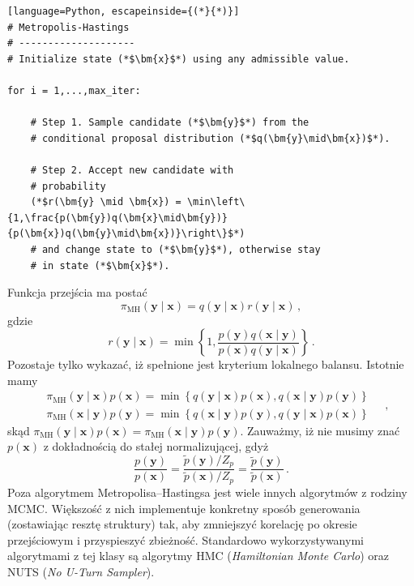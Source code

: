 \documentclass{myclass}
\begin{document}
\begin{lstlisting}[language=Python, escapeinside={(*}{*)}]
# Metropolis-Hastings 
# -------------------- 
# Initialize state (*$\bm{x}$*) using any admissible value. 

for i = 1,...,max_iter: 

    # Step 1. Sample candidate (*$\bm{y}$*) from the 
    # conditional proposal distribution (*$q(\bm{y}\mid\bm{x})$*).
    
    # Step 2. Accept new candidate with 
    # probability 
    (*$r(\bm{y} \mid \bm{x}) = \min\left\{1,\frac{p(\bm{y})q(\bm{x}\mid\bm{y})}{p(\bm{x})q(\bm{y}\mid\bm{x})}\right\}$*) 
    # and change state to (*$\bm{y}$*), otherwise stay 
    # in state (*$\bm{x}$*).

\end{lstlisting}

Funkcja przejścia ma postać
\[
\pi_\text{MH}(\bm{y}\mid\bm{x}) = q(\bm{y} \mid \bm{x}) r(\bm{y} \mid \bm{x})\,,
\]
gdzie
\[
    r(\bm{y} \mid \bm{x}) = \min\left\{1, \frac{p(\bm{y})q(\bm{x}\mid\bm{y})}{p(\bm{x})q(\bm{y}\mid\bm{x})}\right\}\,.
\]
Pozostaje tylko wykazać, iż spełnione jest kryterium lokalnego balansu. Istotnie mamy
\[
\begin{split}
&\pi_\text{MH}(\bm{y}\mid\bm{x})p(\bm{x}) = \min\left\{q(\bm{y}\mid\bm{x})p(\bm{x}), q(\bm{x}\mid\bm{y})p(\bm{y})\right\}\\
&\pi_\text{MH}(\bm{x}\mid\bm{y})p(\bm{y}) = \min\left\{q(\bm{x}\mid\bm{y})p(\bm{y}), q(\bm{y}\mid\bm{x})p(\bm{x})\right\}
\end{split}\quad,
\]
skąd \(\pi_\text{MH}(\bm{y}\mid\bm{x})p(\bm{x}) = \pi_\text{MH}(\bm{x}\mid\bm{y})p(\bm{y})\).
Zauważmy, iż nie musimy znać \(p(\bm{x})\) z dokładnością do stałej normalizującej, gdyż
\[
\frac{p(\bm{y})}{p(\bm{x})} = \frac{\tilde{p}(\bm{y})/Z_p}{\tilde{p}(\bm{x})/Z_p} = \frac{\tilde{p}(\bm{y})}{\tilde{p}(\bm{x})}\,.
\]
Poza algorytmem Metropolisa--Hastingsa jest wiele innych algorytmów z rodziny MCMC. Większość z nich
implementuje konkretny sposób generowania (zostawiając resztę struktury) tak, aby zmniejszyć
korelację po okresie przejściowym i przyspieszyć zbieżność. Standardowo wykorzystywanymi algorytmami
z tej klasy są algorytmy HMC (\emph{Hamiltonian Monte Carlo}) oraz NUTS (\emph{No U-Turn
Sampler}).

\end{document}
